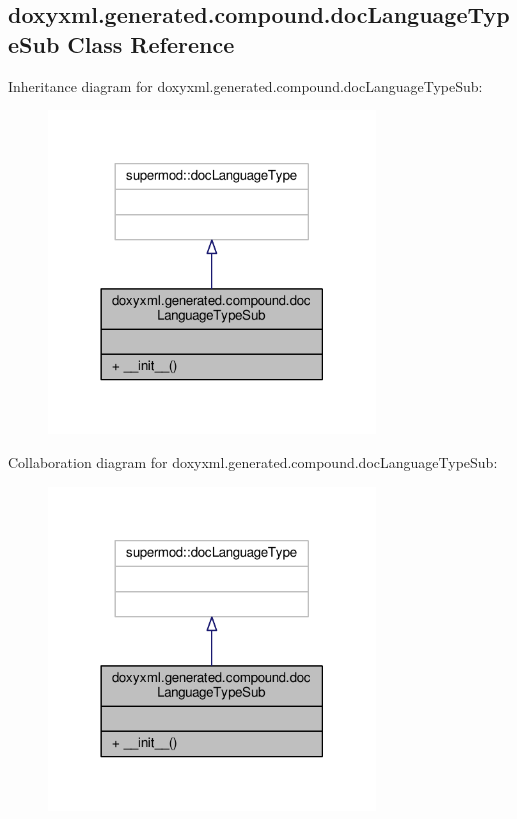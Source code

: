 \subsection{doxyxml.\+generated.\+compound.\+doc\+Language\+Type\+Sub Class Reference}
\label{classdoxyxml_1_1generated_1_1compound_1_1docLanguageTypeSub}


Inheritance diagram for doxyxml.\+generated.\+compound.\+doc\+Language\+Type\+Sub\+:
\nopagebreak
\begin{figure}[H]
\begin{center}
\leavevmode
\includegraphics[width=246pt]{dd/d6e/classdoxyxml_1_1generated_1_1compound_1_1docLanguageTypeSub__inherit__graph}
\end{center}
\end{figure}


Collaboration diagram for doxyxml.\+generated.\+compound.\+doc\+Language\+Type\+Sub\+:
\nopagebreak
\begin{figure}[H]
\begin{center}
\leavevmode
\includegraphics[width=246pt]{d1/d49/classdoxyxml_1_1generated_1_1compound_1_1docLanguageTypeSub__coll__graph}
\end{center}
\end{figure}

